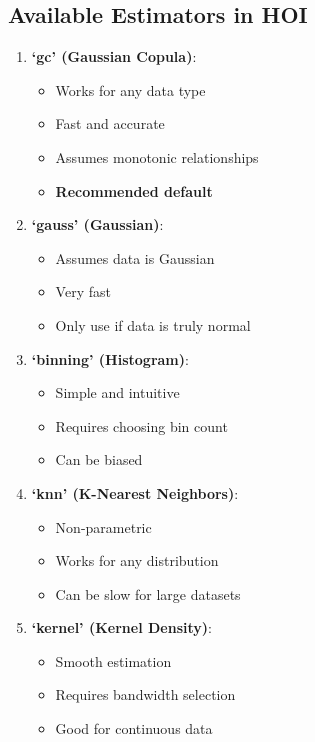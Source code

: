 \documentclass[
  11pt,
  letterpaper,
  oneside,
  openany]{book}
\providecommand{\tightlist}{%
  \setlength{\itemsep}{0pt}\setlength{\parskip}{0pt}}
\begin{document}
\subsection{Available Estimators in
HOI}\label{available-estimators-in-hoi}

\begin{enumerate}
\def\labelenumi{\arabic{enumi}.}
\tightlist
\item
  \textbf{`gc' (Gaussian Copula)}:

  \begin{itemize}
  \tightlist
  \item
    Works for any data type
  \item
    Fast and accurate
  \item
    Assumes monotonic relationships
  \item
    \textbf{Recommended default}
  \end{itemize}
\item
  \textbf{`gauss' (Gaussian)}:

  \begin{itemize}
  \tightlist
  \item
    Assumes data is Gaussian
  \item
    Very fast
  \item
    Only use if data is truly normal
  \end{itemize}
\item
  \textbf{`binning' (Histogram)}:

  \begin{itemize}
  \tightlist
  \item
    Simple and intuitive
  \item
    Requires choosing bin count
  \item
    Can be biased
  \end{itemize}
\item
  \textbf{`knn' (K-Nearest Neighbors)}:

  \begin{itemize}
  \tightlist
  \item
    Non-parametric
  \item
    Works for any distribution
  \item
    Can be slow for large datasets
  \end{itemize}
\item
  \textbf{`kernel' (Kernel Density)}:

  \begin{itemize}
  \tightlist
  \item
    Smooth estimation
  \item
    Requires bandwidth selection
  \item
    Good for continuous data
  \end{itemize}
\end{enumerate}
\end{document}
